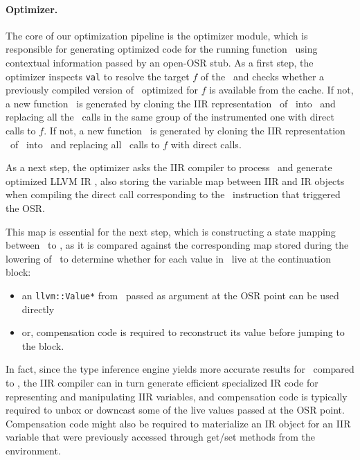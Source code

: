 \paragraph{Optimizer.}
The core of our optimization pipeline is the optimizer module, which is responsible for generating optimized code for the running function \gBase\ using contextual information passed by an open-OSR stub. As a first step, the optimizer inspects {\tt val} to resolve the target $f$ of the \feval\ and checks whether a previously compiled version of \gBase\ optimized for $f$ is available from the cache.
\ifdefined \fullver
If not, a new function \gOpt\ is generated by cloning the IIR representation \gIIR\ of \gBase\ into \gOptIIR\ and replacing all the \feval\ calls in the same group of the instrumented one with direct calls to $f$.
\else
If not, a new function \gOpt\ is generated by cloning the IIR representation \gIIR\ of \gBase\ into \gOptIIR\ and replacing all \feval\ calls to $f$ with direct calls.
\fi

As a next step, the optimizer asks the IIR compiler to process \gOptIIR\ and generate optimized LLVM IR \gOptIR, also storing the variable map between IIR and IR objects when compiling the direct call corresponding to the \feval\ instruction that triggered the OSR.
\ifdefined \fullver

\fi
This map is essential for the next step, which is constructing a state mapping between \gIR\ to \gOptIR, as it is compared against the corresponding map stored during the lowering of \gBase\ to determine whether for each value in \gOptIR\ live at the continuation block:
\begin{itemize}
\item an {\tt llvm::Value*} from \gIR\ passed as argument at the OSR point can be used directly
\item or, compensation code is required to reconstruct its value before jumping to the block.
\end{itemize}

\noindent In fact, since the type inference engine yields more accurate results for \gOptIIR\ compared to \gIIR, the IIR compiler can in turn generate efficient specialized IR code for representing and manipulating IIR variables, and compensation code is typically required to unbox or downcast some of the live values passed at the OSR point.
\ifdefined \fullver
Compensation code might also be required to materialize an IR object for an IIR variable that were previously accessed through get/set methods from the environment. %
\fi

